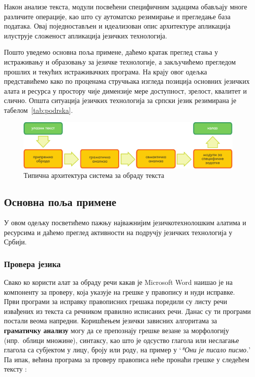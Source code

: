 \begin{multicols}{2}
Након анализе текста, модули посвећени специфичним задацима о\-бав\-ља\-ју многе различите операције, као што су аутоматско резимирање и прегледање база података. Овај поједностављен и идеализован опис архитектуре апликација илуструје сложеност апликација језичких технологија. 

Пошто уведемо основна поља примене, даћемо кратак преглед стања у истраживању и образовању за језичке технологије, а закључићемо прегледом прошлих и текућих истраживачких програма. На крају овог одељка представићемо како по проценама стручњака изгледа позиција основних језичких алата и ресурса у простору чије димензије мере доступност, зрелост, квалитет и слично. 
Општа ситуација језичких технологија за српски језик резимирана је табелом~\ref{tab:podrska}. 


\begin{figure}[htb]
  \center
  \includegraphics[width=\textwidth]{../_media/serbian/text_processing_app_architecture}
  \caption{Типична архитектура система за обраду текста}
  \label{fig:textprocessingarch_sr}
\end{figure}


 \subsection {Основна поља примене}
   
   У овом одељку посветићемо пажњу најважнијим језичкотехнолошким алатима и ресурсима и даћемо преглед активности на подручју језичких технологија у Србији. %
 \subsubsection {Провера језика}
   
Свако ко користи алат за обраду речи какав је Microsoft Word наишао је на компоненту за проверу, која указује на грешке у правопису и нуди исправке. Први програми за исправку правописних грешака поредили су листу речи извађених из текста са речником правилно исписаних речи. Данас су ти програми постали веома напредни. Коришћењем језички зависних алгоритама за \textbf{граматичку анализу} могу да се препознају грешке везане за морфологију (нпр.~облици множине), синтаксу, као што је одсуство глагола или неслагање глагола са субјектом у лицу, броју или роду, на пример у ‘\textit{*Они је писало писмо.}’ Па ипак, већина програма за проверу правописа неће пронаћи грешке у следећем тексту \cite{ZAR}: 


\end{multicols}
